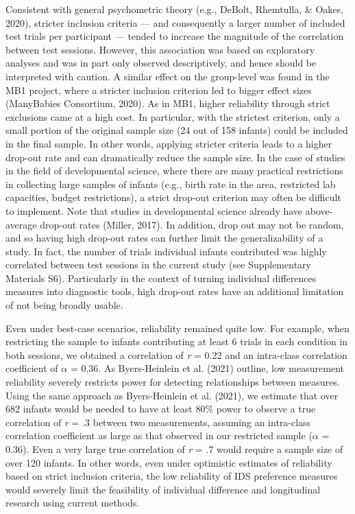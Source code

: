 \documentclass[
  english,
  man,floatsintext]{apa6}
\begin{document}
Consistent with general psychometric theory (e.g., DeBolt, Rhemtulla, \& Oakes, 2020), stricter inclusion criteria --- and consequently a larger number of included test trials per participant --- tended to increase the magnitude of the correlation between test sessions.
However, this association was based on exploratory analyses and was in part only observed descriptively, and hence should be interpreted with caution.
A similar effect on the group-level was found in the MB1 project, where a stricter inclusion criterion led to bigger effect sizes (ManyBabies Consortium, 2020).
As in MB1, higher reliability through strict exclusions came at a high cost.
In particular, with the strictest criterion, only a small portion of the original sample size (24 out of 158 infants) could be included in the final sample.
In other words, applying stricter criteria leads to a higher drop-out rate and can dramatically reduce the sample size.
In the case of studies in the field of developmental science, where there are many practical restrictions in collecting large samples of infants (e.g., birth rate in the area, restricted lab capacities, budget restrictions), a strict drop-out criterion may often be difficult to implement.
Note that studies in developmental science already have above-average drop-out rates (Miller, 2017).
In addition, drop out may not be random, and so having high drop-out rates can further limit the generalizability of a study.
In fact, the number of trials individual infants contributed was highly correlated between test sessions in the current study (see Supplementary Materials S6).
Particularly in the context of turning individual differences measures into diagnostic tools, high drop-out rates have an additional limitation of not being broadly usable.

Even under best-case scenarios, reliability remained quite low. For example, when restricting the sample to infants contributing at least 6 trials in each condition in both sessions, we obtained a correlation of \emph{r} = 0.22 and an intra-class correlation coefficient of \(\alpha\) = 0.36. As Byers-Heinlein et al. (2021) outline, low measurement reliability severely restricts power for detecting relationships between measures. Using the same approach as Byers-Heinlein et al. (2021), we estimate that over 682 infants would be needed to have at least 80\% power to observe a true correlation of \emph{r} = .3 between two measurements, assuming an intra-class correlation coefficient as large as that observed in our restricted sample (\(\alpha\) = 0.36). Even a very large true correlation of \emph{r} = .7 would require a sample size of over 120 infants. In other words, even under optimistic estimates of reliability based on strict inclusion criteria, the low reliability of IDS preference measures would severely limit the feasibility of individual difference and longitudinal research using current methods.
\end{document}
